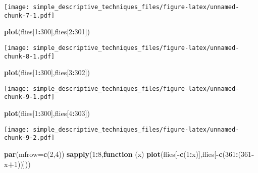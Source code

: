 \documentclass[]{article}
\newenvironment{Shaded}{\begin{snugshade}}{\end{snugshade}}
\newcommand{\ControlFlowTok}[1]{\textcolor[rgb]{0.13,0.29,0.53}{\textbf{#1}}}
\newcommand{\DataTypeTok}[1]{\textcolor[rgb]{0.13,0.29,0.53}{#1}}
\newcommand{\DecValTok}[1]{\textcolor[rgb]{0.00,0.00,0.81}{#1}}
\newcommand{\KeywordTok}[1]{\textcolor[rgb]{0.13,0.29,0.53}{\textbf{#1}}}
\newcommand{\NormalTok}[1]{#1}
\newcommand{\OperatorTok}[1]{\textcolor[rgb]{0.81,0.36,0.00}{\textbf{#1}}}
\begin{document}
\texttt{[image: simple\_descriptive\_techniques\_files/figure-latex/unnamed-chunk-7-1.pdf]}

\begin{Shaded}
\begin{Highlighting}[]
\KeywordTok{plot}\NormalTok{(flies[}\DecValTok{1}\OperatorTok{:}\DecValTok{300}\NormalTok{],flies[}\DecValTok{2}\OperatorTok{:}\DecValTok{301}\NormalTok{])}
\end{Highlighting}
\end{Shaded}

\texttt{[image: simple\_descriptive\_techniques\_files/figure-latex/unnamed-chunk-8-1.pdf]}

\begin{Shaded}
\begin{Highlighting}[]
\KeywordTok{plot}\NormalTok{(flies[}\DecValTok{1}\OperatorTok{:}\DecValTok{300}\NormalTok{],flies[}\DecValTok{3}\OperatorTok{:}\DecValTok{302}\NormalTok{])}
\end{Highlighting}
\end{Shaded}

\texttt{[image: simple\_descriptive\_techniques\_files/figure-latex/unnamed-chunk-9-1.pdf]}

\begin{Shaded}
\begin{Highlighting}[]
\KeywordTok{plot}\NormalTok{(flies[}\DecValTok{1}\OperatorTok{:}\DecValTok{300}\NormalTok{],flies[}\DecValTok{4}\OperatorTok{:}\DecValTok{303}\NormalTok{])}
\end{Highlighting}
\end{Shaded}

\texttt{[image: simple\_descriptive\_techniques\_files/figure-latex/unnamed-chunk-9-2.pdf]}

\begin{Shaded}
\begin{Highlighting}[]
\KeywordTok{par}\NormalTok{(}\DataTypeTok{mfrow=}\KeywordTok{c}\NormalTok{(}\DecValTok{2}\NormalTok{,}\DecValTok{4}\NormalTok{))}
\KeywordTok{sapply}\NormalTok{(}\DecValTok{1}\OperatorTok{:}\DecValTok{8}\NormalTok{,}\ControlFlowTok{function}\NormalTok{ (x) }\KeywordTok{plot}\NormalTok{(flies[}\OperatorTok{-}\KeywordTok{c}\NormalTok{(}\DecValTok{1}\OperatorTok{:}\NormalTok{x)],flies[}\OperatorTok{-}\KeywordTok{c}\NormalTok{(}\DecValTok{361}\OperatorTok{:}\NormalTok{(}\DecValTok{361}\OperatorTok{-}\NormalTok{x}\OperatorTok{+}\DecValTok{1}\NormalTok{))]))}
\end{Highlighting}
\end{Shaded}
\end{document}
